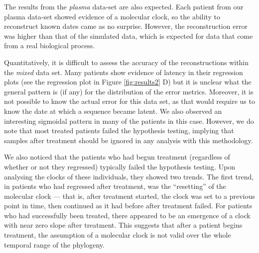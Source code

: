 \documentclass[12pt]{article}
\begin{document}
The results from the {\em plasma} data-set are also expected. 
Each patient from our plasma data-set showed evidence of a molecular clock, so the ability to reconstruct known dates came as no surprise. 
However, the reconstruction error was higher than that of the simulated data, which is expected for data that come from a real biological process.

Quantitatively, it is difficult to assess the accuracy of the reconstructions within the {\em mixed} data set. 
Many patients show evidence of latency in their regression plots (see the regression plot in Figure \ref{fig:results2} D) but it is unclear what the general pattern is (if any) for the distribution of the error metrics. 
Moreover, it is not possible to know the actual error for this data set, as that would require us to know the date at which a sequence became latent. 
We also observed an interesting sigmoidal pattern in many of the patients in this case.
However, we do note that most treated patients failed the hypothesis testing, implying that samples after treatment should be ignored in any analysis with this methodology.





We also noticed that the patients who had begun treatment (regardless of whether or not they regressed) typically failed the hypothesis testing. Upon analysing the clocks of these individuals, they showed two trends. 
The first trend, in patients who had regressed after treatment, was the ``resetting'' of the molecular clock --- that is, after treatment started, the clock was set to a previous point in time, then continued as it had before after treatment failed. 
For patients who had successfully been treated, there appeared to be an emergence of a clock with near zero slope after treatment.
This suggests that after a patient begins treatment, the assumption of a molecular clock  is not valid over the whole temporal range of the phylogeny. 
\end{document}
